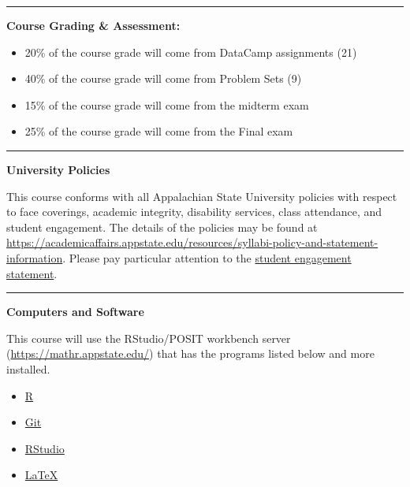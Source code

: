 \documentclass[
]{article}
\providecommand{\tightlist}{%
  \setlength{\itemsep}{0pt}\setlength{\parskip}{0pt}}
\begin{document}
\begin{center}\rule{0.5\linewidth}{0.5pt}\end{center}

\textbf{Course Grading \& Assessment:}

\begin{itemize}
\item
  20\% of the course grade will come from DataCamp assignments (21)
\item
  40\% of the course grade will come from Problem Sets (9)
\item
  15\% of the course grade will come from the midterm exam
\item
  25\% of the course grade will come from the Final exam
\end{itemize}

\begin{center}\rule{0.5\linewidth}{0.5pt}\end{center}

\textbf{University Policies}

This course conforms with all Appalachian State University policies with
respect to face coverings, academic integrity, disability services,
class attendance, and student engagement. The details of the policies
may be found at
\url{https://academicaffairs.appstate.edu/resources/syllabi-policy-and-statement-information}.
Please pay particular attention to the
\href{https://academicaffairs.appstate.edu/sites/academicaffairs.appstate.edu/files/gerber_resolution_student_workload_removed_approved_statement_per_mmccoughy_and_sedwards.pdf}{student
engagement statement}.

\begin{center}\rule{0.5\linewidth}{0.5pt}\end{center}

\textbf{Computers and Software}

This course will use the RStudio/POSIT workbench server
(\url{https://mathr.appstate.edu/}) that has the programs listed below
and more installed.

\begin{itemize}
\tightlist
\item
  \href{https://cran.r-project.org}{R}
\item
  \href{https://git-scm.com/downloads}{Git}
\item
  \href{https://www.rstudio.com/products/rstudio/download/}{RStudio}
\item
  \href{https://www.ctan.org/starter}{LaTeX}
\end{itemize}
\end{document}
